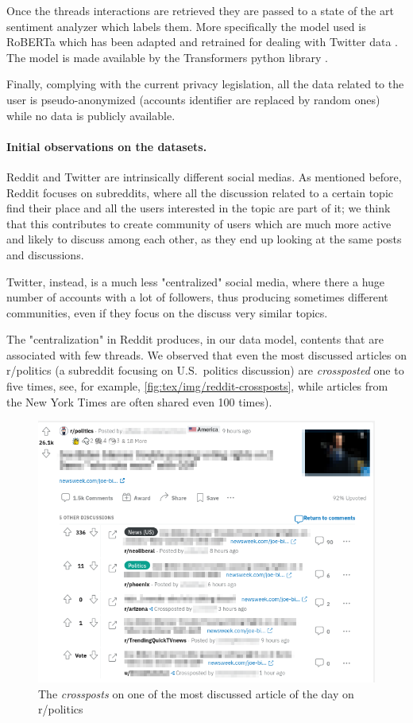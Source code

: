 Once the threads interactions are retrieved they are passed to a state of the
art sentiment analyzer which labels them. More specifically the model used is
RoBERTa which has been adapted and retrained for dealing with Twitter
data \cite{Barbieri2020}. The model is made available by the Transformers
python library \cite{wolf-etal-2020-transformers}.

\bigskip

Finally, complying with the current privacy legislation, all the data related
to the user is pseudo-anonymized (accounts identifier are replaced by random
ones) while no data is publicly available.

\paragraph{Initial observations on the datasets.}%
\label{par:some_observations_on_the_datasets}

Reddit and Twitter are intrinsically different social medias. As mentioned
before, Reddit focuses on subreddits, where all the discussion related to a
certain topic find their place and all the users interested in the topic are
part of it; we think that this contributes to create community of users which are much more
active and likely to discuss among each other, as they end up looking at the
same posts and discussions.

Twitter, instead, is a much less "centralized" social media, where there a
huge number of accounts with a lot of
followers, thus producing sometimes different communities, even if they focus
on the discuss very similar topics.

The "centralization" in Reddit produces, in our data model, contents that are
associated with few threads. We observed that even the most discussed articles
on r/politics (a subreddit focusing on U.S.\ politics discussion) are
\emph{crossposted} one to five times, see, for example,
\autoref{fig:tex/img/reddit-crossposts}, while articles from the New York Times are
often shared even 100 times).

\begin{figure}
	\centering
	\includegraphics[width=0.8\linewidth]{tex/img/reddit-crossposts.png}
	\caption{The \emph{crossposts} on one of the most discussed article of the
		day on r/politics}%
	\label{fig:tex/img/reddit-crossposts}
\end{figure}

